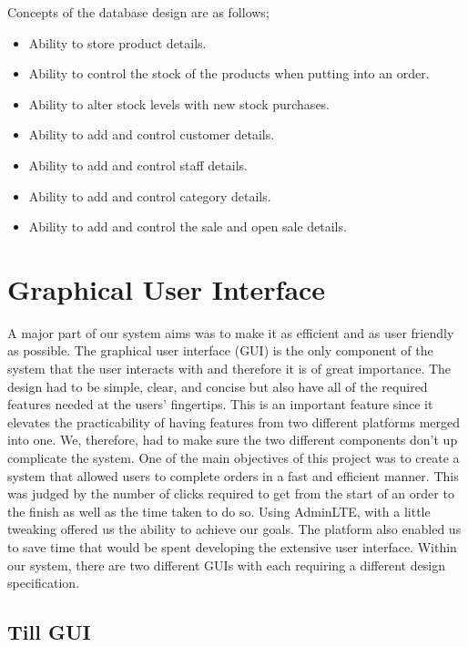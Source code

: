 Concepts of the database design are as follows;

\begin{itemize}
    \item Ability to store product details.
    \item Ability to control the stock of the products when putting into an order.
    \item Ability to alter stock levels with new stock purchases.
    \item Ability to add and control customer details.
    \item Ability to add and control staff details.
    \item Ability to add and control category details.
    \item Ability to add and control the sale and open sale details.
\end{itemize}


\section{Graphical User Interface}

A major part of our system aims was to make it as efficient and as user friendly as possible. The graphical user interface (GUI) is the only component of the system that the user interacts with and therefore it is of great importance. The design had to be simple, clear, and concise but also have all of the required features needed at the users' fingertips. This is an important feature since it elevates the practicability of having features from two different platforms merged into one. We, therefore, had to make sure the two different components don’t up complicate the system.
\newline
\newline
One of the main objectives of this project was to create a system that allowed users to complete orders in a fast and efficient manner. This was judged by the number of clicks required to get from the start of an order to the finish as well as the time taken to do so. Using AdminLTE, with a little tweaking offered us the ability to achieve our goals. The platform also enabled us to save time that would be spent developing the extensive user interface. Within our system, there are two different GUIs with each requiring a different design specification.

\subsection{Till GUI}

